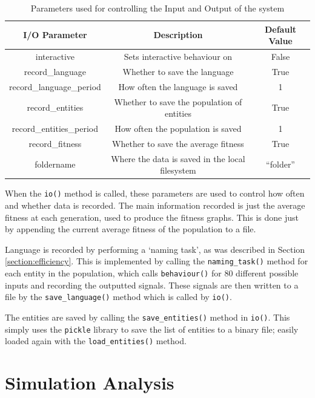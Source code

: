 \documentclass[12pt,a4paper,twoside,openright]{report}
\begin{document}
\begin{table}[t]
\centering
 \begin{tabular}{ c | c | c}
 \bf{I/O Parameter} & \bf{Description} & \bf{Default Value} \\ [0.5ex] 
 \hline
interactive & Sets interactive behaviour on & False \\
record\_language & Whether to save the language & True \\
record\_language\_period & How often the language is saved & 1 \\
record\_entities & Whether to save the population of entities & True \\
record\_entities\_period & How often the population is saved & 1 \\
record\_fitness & Whether to save the average fitness & True \\
foldername & Where the data is saved in the local filesystem & ``folder'' \\
\end{tabular}
\caption{Parameters used for controlling the Input and Output of the system}
\label{table:io-params}
\end{table}

When the \texttt{io()} method is called, these parameters are used to control how often and whether data is recorded. The main information recorded is just the average fitness at each generation, used to produce the fitness graphs. This is done just by appending the current average fitness of the population to a file.

Language is recorded by performing a `naming task', as was described in Section \ref{section:efficiency}. This is implemented by calling the \texttt{naming\_task()} method for each entity in the population, which calls \texttt{behaviour()} for 80 different possible inputs and recording the outputted signals. These signals are then written to a file by the \texttt{save\_language()} method which is called by \texttt{io()}.

The entities are saved by calling the \texttt{save\_entities()} method in \texttt{io()}. This simply uses the \texttt{pickle} library to save the list of entities to a binary file; easily loaded again with the \texttt{load\_entities()} method.

\section{Simulation Analysis}\label{section:impl-analysis}
\end{document}
